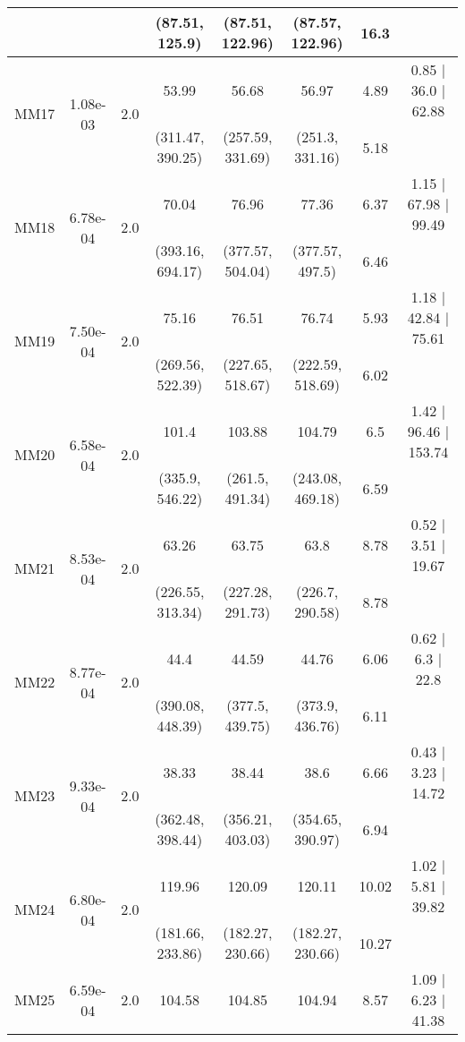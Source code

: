 \begin{longtable}{|c|c|c|c|c|c|c|c|}
	 &  &  & (87.51, 125.9) & (87.51, 122.96) & (87.57, 122.96) & 16.3 & \\
 	\hline
	\multirow{2}{*}{MM17} & \multirow{2}{*}{1.08e-03} & \multirow{2}{*}{2.0} & 53.99 & 56.68 & 56.97 & 4.89 & 0.85 $\mid$ 36.0 $\mid$ 62.88\\
	 &  &  & (311.47, 390.25) & (257.59, 331.69) & (251.3, 331.16) & 5.18 & \\
 	\hline
	\multirow{2}{*}{MM18} & \multirow{2}{*}{6.78e-04} & \multirow{2}{*}{2.0} & 70.04 & 76.96 & 77.36 & 6.37 & 1.15 $\mid$ 67.98 $\mid$ 99.49\\
	 &  &  & (393.16, 694.17) & (377.57, 504.04) & (377.57, 497.5) & 6.46 & \\
 	\hline
	\multirow{2}{*}{MM19} & \multirow{2}{*}{7.50e-04} & \multirow{2}{*}{2.0} & 75.16 & 76.51 & 76.74 & 5.93 & 1.18 $\mid$ 42.84 $\mid$ 75.61\\
	 &  &  & (269.56, 522.39) & (227.65, 518.67) & (222.59, 518.69) & 6.02 & \\
 	\hline
	\multirow{2}{*}{MM20} & \multirow{2}{*}{6.58e-04} & \multirow{2}{*}{2.0} & 101.4 & 103.88 & 104.79 & 6.5 & 1.42 $\mid$ 96.46 $\mid$ 153.74\\
	 &  &  & (335.9, 546.22) & (261.5, 491.34) & (243.08, 469.18) & 6.59 & \\
 	\hline
	\multirow{2}{*}{MM21} & \multirow{2}{*}{8.53e-04} & \multirow{2}{*}{2.0} & 63.26 & 63.75 & 63.8 & 8.78 & 0.52 $\mid$ 3.51 $\mid$ 19.67\\
	 &  &  & (226.55, 313.34) & (227.28, 291.73) & (226.7, 290.58) & 8.78 & \\
 	\hline
	\multirow{2}{*}{MM22} & \multirow{2}{*}{8.77e-04} & \multirow{2}{*}{2.0} & 44.4 & 44.59 & 44.76 & 6.06 & 0.62 $\mid$ 6.3 $\mid$ 22.8\\
	 &  &  & (390.08, 448.39) & (377.5, 439.75) & (373.9, 436.76) & 6.11 & \\
 	\hline
	\multirow{2}{*}{MM23} & \multirow{2}{*}{9.33e-04} & \multirow{2}{*}{2.0} & 38.33 & 38.44 & 38.6 & 6.66 & 0.43 $\mid$ 3.23 $\mid$ 14.72\\
	 &  &  & (362.48, 398.44) & (356.21, 403.03) & (354.65, 390.97) & 6.94 & \\
 	\hline
	\multirow{2}{*}{MM24} & \multirow{2}{*}{6.80e-04} & \multirow{2}{*}{2.0} & 119.96 & 120.09 & 120.11 & 10.02 & 1.02 $\mid$ 5.81 $\mid$ 39.82\\
	 &  &  & (181.66, 233.86) & (182.27, 230.66) & (182.27, 230.66) & 10.27 & \\
 	\hline
	\multirow{2}{*}{MM25} & \multirow{2}{*}{6.59e-04} & \multirow{2}{*}{2.0} & 104.58 & 104.85 & 104.94 & 8.57 & 1.09 $\mid$ 6.23 $\mid$ 41.38\\

\end{longtable}
